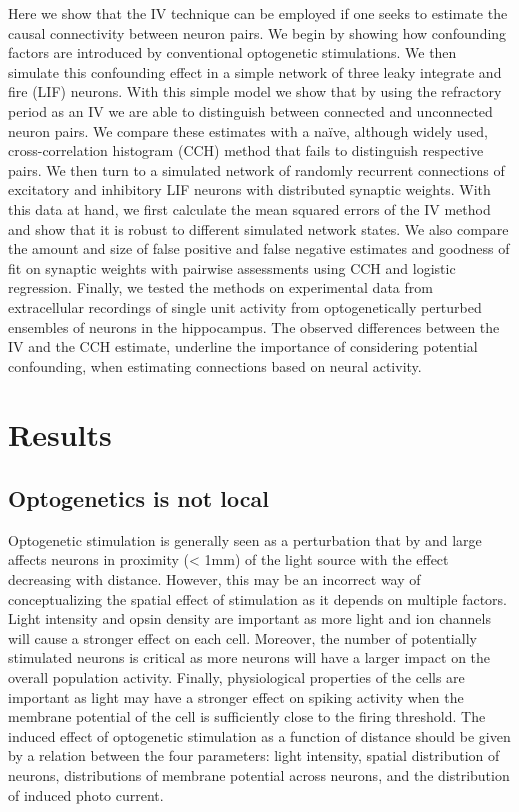 \documentclass[11pt]{article}
\begin{document}
Here we show that the IV technique can be employed if one seeks to estimate the causal connectivity between neuron pairs. 
We begin by showing how confounding factors are introduced by conventional optogenetic stimulations. 
We then simulate this confounding effect in a simple network of three leaky integrate and fire (LIF) neurons. 
With this simple model we show that by using the refractory period as an IV we are able to distinguish between connected and unconnected neuron pairs. 
We compare these estimates with a na\"ive, although widely used, cross-correlation histogram (CCH) method that fails to distinguish respective pairs. 
We then turn to a simulated network of randomly recurrent connections of excitatory and inhibitory LIF neurons with distributed synaptic weights. 
With this data at hand, we first calculate the mean squared errors of the IV method and show that it is robust to different simulated network states. 
We also compare the amount and size of false positive and false negative estimates and goodness of fit on synaptic weights with pairwise assessments using CCH and logistic regression.
Finally, we tested the methods on experimental data from extracellular recordings of single unit activity from optogenetically perturbed ensembles of neurons in the hippocampus.
The observed differences between the IV and the CCH estimate, underline the importance of considering potential confounding, when estimating connections based on neural activity.

\section{Results}
\subsection{Optogenetics is not local}
Optogenetic stimulation is generally seen as a perturbation that by and large affects neurons in proximity (< 1mm) of the light source with the effect decreasing with distance. 
However, this may be an incorrect way of conceptualizing the spatial effect of stimulation as it depends on multiple factors. 
Light intensity and opsin density are important as more light and ion channels will cause a stronger effect on each cell. 
Moreover, the number of potentially stimulated neurons is critical as more neurons will have a larger impact on the overall population activity. 
Finally, physiological properties of the cells are important as light may have a stronger effect on spiking activity when the membrane potential of the cell is sufficiently close to the firing threshold. 
The induced effect of optogenetic stimulation as a function of distance should be given by a relation between the four parameters: light intensity, spatial distribution of neurons, distributions of membrane potential across neurons, and the distribution of induced photo current.
\end{document}
